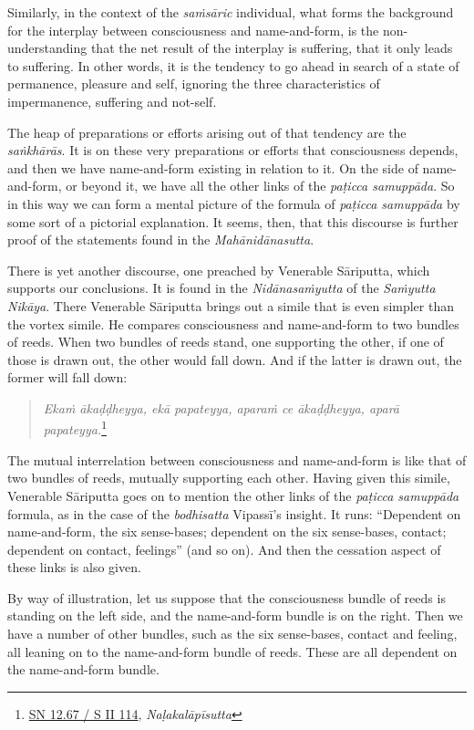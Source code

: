 Similarly, in the context of the \emph{saṁsāric} individual, what forms the background for the interplay between consciousness and name-and-form, is the non-understanding that the net result of the interplay is suffering, that it only leads to suffering. In other words, it is the tendency to go ahead in search of a state of permanence, pleasure and self, ignoring the three characteristics of impermanence, suffering and not-self.

The heap of preparations or efforts arising out of that tendency are the \emph{saṅkhārās}. It is on these very preparations or efforts that consciousness depends, and then we have name-and-form existing in relation to it. On the side of name-and-form, or beyond it, we have all the other links of the \emph{paṭicca samuppāda}. So in this way we can form a mental picture of the formula of \emph{paṭicca samuppāda} by some sort of a pictorial explanation. It seems, then, that this discourse is further proof of the statements found in the \emph{Mahānidānasutta}.

There is yet another discourse, one preached by Venerable Sāriputta, which supports our conclusions. It is found in the \emph{Nidānasaṁyutta} of the \emph{Saṁyutta Nikāya}. There Venerable Sāriputta brings out a simile that is even simpler than the vortex simile. He compares consciousness and name-and-form to two bundles of reeds. When two bundles of reeds stand, one supporting the other, if one of those is drawn out, the other would fall down. And if the latter is drawn out, the former will fall down:

\begin{quote}
\emph{Ekaṁ ākaḍḍheyya, ekā papateyya, aparaṁ ce ākaḍḍheyya, aparā papateyya.}\footnote{\href{https://suttacentral.net/sn12.67/pli/ms}{SN 12.67 / S II 114}, \emph{Naḷakalāpīsutta}}
\end{quote}

The mutual interrelation between consciousness and name-and-form is like that of two bundles of reeds, mutually supporting each other. Having given this simile, Venerable Sāriputta goes on to mention the other links of the \emph{paṭicca samuppāda} formula, as in the case of the \emph{bodhisatta} Vipassī's insight. It runs: ``Dependent on name-and-form, the six sense-bases; dependent on the six sense-bases, contact; dependent on contact, feelings'' (and so on). And then the cessation aspect of these links is also given.

By way of illustration, let us suppose that the consciousness bundle of reeds is standing on the left side, and the name-and-form bundle is on the right. Then we have a number of other bundles, such as the six sense-bases, contact and feeling, all leaning on to the name-and-form bundle of reeds. These are all dependent on the name-and-form bundle.

